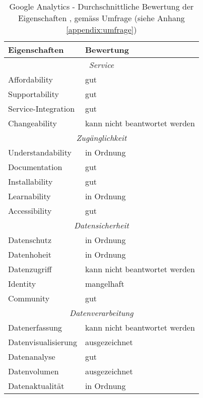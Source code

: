 \begin{table}[h]
	\centering
	\begin{tabular}{ | p{4cm} | p{10cm} |}
		\hline
    \textbf{Eigenschaften} & \textbf{Bewertung}  \\ \hline
    \multicolumn{2}{|c|}{\textit{Service}}\\ \hline 
    Affordability  &  gut \\ \hline
    Supportability & gut \\ \hline
    Service-Integration & gut \\ \hline
    Changeability  & kann nicht beantwortet werden \\ \hline
    \multicolumn{2}{|c|}{\textit{Zugänglichkeit}}\\ \hline 
    Understandability   & in Ordnung \\ \hline
    Documentation  & gut \\ \hline
    Installability & gut \\ \hline
    Learnability  & in Ordnung \\ \hline
    Accessibility  & gut \\ \hline
    \multicolumn{2}{|c|}{\textit{Datensicherheit}} \\ \hline
    Datenschutz  & in Ordnung \\ \hline
    Datenhoheit & in Ordnung \\ \hline
    Datenzugriff  & kann nicht beantwortet werden \\ \hline
    Identity  & mangelhaft \\  \hline
    Community  & gut \\ \hline
    \multicolumn{2}{|c|}{\textit{Datenverarbeitung}} \\ \hline
    Datenerfassung  & kann nicht beantwortet werden \\  \hline
    Datenvisualisierung & ausgezeichnet \\ \hline
    Datenanalyse & gut \\ \hline
    Datenvolumen & ausgezeichnet \\ \hline
    Datenaktualität  & in Ordnung \\ \hline
	\end{tabular}
	\caption{Google Analytics - Durchschnittliche Bewertung der Eigenschaften \parencite{softwareProcurementEvaluationTable}, \parencite[S. 178]{nakatani2011toolselectionmethod} gemäss Umfrage (siehe Anhang \ref{appendix:umfrage})}
	\label{tab: googleanalyticsfeaturebewertung}
\end{table}

